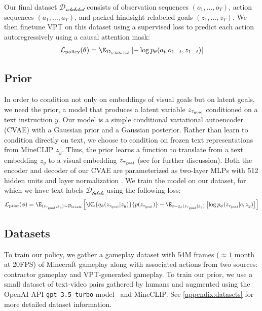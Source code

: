 \newcommand{\drelabeled}{\mathcal{D_{\text{relabeled}}}}

Our final dataset $\drelabeled$ consists of observation sequences $(o_1, \ldots, o_T)$, action sequences $(a_1, \ldots, a_T)$, and packed hindsight relabeled goals $(z_1, \ldots, z_T)$. We then finetune VPT on this dataset using a supervised loss to predict each action autoregressively using a causal attention mask:
\begin{equation}
    \mathcal{L}_{\text{policy}}(\theta) = \E_{\drelabeled}\left[-\log p_{\theta}(a_t|o_{1\ldots t}, z_{1\ldots t})\right]
\end{equation}

\subsection{Prior}

\newcommand{\dlabeled}{\mathcal{D_{\text{labels}}}}

In order to condition not only on embeddings of visual goals but on latent goals, we need the prior, a model that produces a latent variable $z_{\tau_{\text{goal}}}$ conditioned on a text instruction $y$. Our model is a simple conditional variational autoencoder (CVAE) \citep{cvae,vae} with a Gaussian prior and a Gaussian posterior. Rather than learn to condition directly on text, we choose to condition on frozen text representations from MineCLIP $z_y$. Thus, the prior learns a function to translate from a text embedding $z_y$ to a visual embedding $z_{\tau_{\text{goal}}}$ (see  for further discussion). Both the encoder and decoder of our CVAE are parameterized as two-layer MLPs with 512 hidden units and layer normalization \citep{ba2016layer}. We train the model on our dataset, for which we have text labels $\dlabeled$ using the following loss:
\begin{equation}
    \mathcal{L}_{\text{prior}}(\phi) = \E_{(\zgoal, z_y) \sim \dlabeled}\left[\KL{q_{\phi}(\zgoal|z_y)}{p(\zgoal)} - \E_{c \sim q_{\phi}(\zgoal|z_y)}\left[\log p_{\phi}(\zgoal|c, z_y)\right]\right]
\end{equation}

\subsection{Datasets}
\label{sec:prior_dataset}
To train our policy, we gather a gameplay dataset with 54M frames ($\approx 1$ month at 20FPS) of Minecraft gameplay along with associated actions from two sources: contractor gameplay and VPT-generated gameplay. To train our prior, we use a small dataset of text-video pairs gathered by humans and augmented using the OpenAI API \texttt{gpt-3.5-turbo} model~\citep{chatgpt} and MineCLIP. See \autoref{appendix:datasets} for more detailed dataset information.

